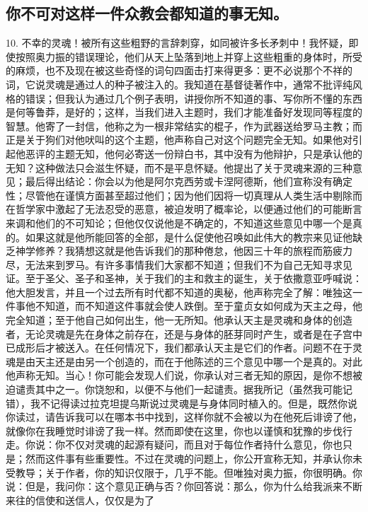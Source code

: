 
\subsection{你不可对这样一件众教会都知道的事无知。}

10. 不幸的灵魂！被所有这些粗野的言辞刺穿，如同被许多长矛刺中！我怀疑，即使按照奥力振的错误理论，他们从天上坠落到地上并穿上这些粗重的身体时，所受的麻烦，也不及现在被这些奇怪的词句四面击打来得更多：更不必说那个不祥的词，它说灵魂是通过人的种子被注入的。我知道在基督徒著作中，通常不批评纯风格的错误；但我认为通过几个例子表明，讲授你所不知道的事、写你所不懂的东西是何等鲁莽，是好的；这样，当我们进入主题时，我们才能准备好发现同等程度的智慧。他寄了一封信，他称之为一根非常结实的棍子，作为武器送给罗马主教；而正是关于狗们对他吠叫的这个主题，他声称自己对这个问题完全无知。如果他对引起他恶评的主题无知，他何必寄送一份辩白书，其中没有为他辩护，只是承认他的无知？这种做法只会滋生怀疑，而不是平息怀疑。他提出了关于灵魂来源的三种意见；最后得出结论：你会以为他是阿尔克西劳或卡涅阿德斯，他们宣称没有确定性；尽管他在谨慎方面甚至超过他们；因为他们因将一切真理从人类生活中剔除而在哲学家中激起了无法忍受的恶意，被迫发明了概率论，以便通过他们的可能断言来调和他们的不可知论；但他仅仅说他是不确定的，不知道这些意见中哪一个是真的。如果这就是他所能回答的全部，是什么促使他召唤如此伟大的教宗来见证他缺乏神学修养？我猜想这就是他告诉我们的那种倦怠，他因三十年的旅程而筋疲力尽，无法来到罗马。有许多事情我们大家都不知道；但我们不为自己无知寻求见证。至于圣父、圣子和圣神，关于我们的主和救主的诞生，关于依撒意亚呼喊说：他大胆发言，并且一个过去所有时代都不知道的奥秘，他声称完全了解：唯独这一件事他不知道，而不知道这件事就会使人跌倒。至于童贞女如何成为天主之母，他完全知道；至于他自己如何出生，他一无所知。他承认天主是灵魂和身体的创造者，无论灵魂是先在身体之前存在，还是与身体的胚芽同时产生，或者是在子宫中已成形后才被送入。在任何情况下，我们都承认天主是它们的作者。问题不在于灵魂是由天主还是由另一个创造的，而在于他陈述的三个意见中哪一个是真的。对此他声称无知。当心！你可能会发现人们说，你承认对三者无知的原因，是你不想被迫谴责其中之一。你饶恕和，以便不与他们一起谴责。据我所记（虽然我可能记错），我不记得读过拉克坦提乌斯说过灵魂是与身体同时植入的。但是，既然你说你读过，请告诉我可以在哪本书中找到，这样你就不会被以为在他死后诽谤了他，就像你在我睡觉时诽谤了我一样。然而即使在这里，你也以谨慎和犹豫的步伐行走。你说：你不仅对灵魂的起源有疑问，而且对于每位作者持什么意见，你也只是；然而这件事有些重要性。不过在灵魂的问题上，你公开宣称无知，并承认你未受教导；关于作者，你的知识仅限于，几乎不能。但唯独对奥力振，你很明确。你说：但是，我问你：这个意见正确与否？你回答说：那么，你为什么给我派来不断来往的信使和送信人，仅仅是为了